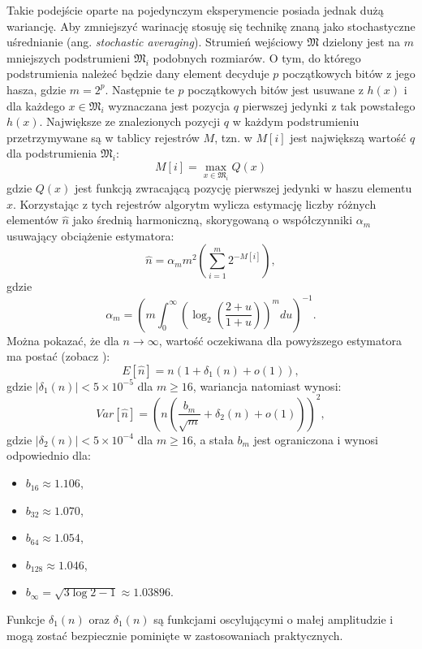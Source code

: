 Takie podejście oparte na pojedynczym eksperymencie posiada jednak dużą wariancję. Aby zmniejszyć warinację stosuję się technikę znaną jako stochastyczne uśrednianie (ang. \textit{stochastic averaging}). Strumień wejściowy $\mathfrak{M}$ dzielony jest na $m$ mniejszych podstrumieni $\mathfrak{M}_i$ podobnych rozmiarów. O tym, do którego podstrumienia należeć będzie dany element decyduje $p$ początkowych bitów z jego hasza, gdzie $m = 2^p$. Następnie te $p$ początkowych bitów jest usuwane z $h(x)$ i dla  każdego $x\in \mathfrak{M}_i$ wyznaczana jest pozycja $q$ pierwszej jedynki z tak powstałego $h(x)$. Największe ze znalezionych pozycji $q$ w każdym podstrumieniu przetrzymywane są w tablicy rejestrów $M$, tzn. w $M[i]$ jest największą  wartość $q$
dla  podstrumienia $\mathfrak{M}_i$:
\begin{equation}
    M[i] = \max_{x \in \mathfrak{M}_i} Q(x)
\end{equation}
gdzie $Q(x)$ jest funkcją zwracającą  pozycję pierwszej jedynki w haszu elementu $x$.
 Korzystając z tych rejestrów algorytm wylicza estymację liczby różnych elementów $\hat{n}$
 jako średnią harmoniczną, skorygowaną o współczynniki ${\alpha}_{m}$ usuwający obciążenie estymatora:
\begin{equation}
    \hat{n} = {\alpha}_m{m}^{2}(\sum_{i=1}^{m} 2^{-M[i]}),
\end{equation}
gdzie
\begin{equation}
    {\alpha}_{m} = (m \int_{0}^{\infty} ({\log}_2(\frac{2 + u}{1 + u}))^m du)^{-1}.
\end{equation}
Można pokazać, że dla  $n \rightarrow \infty$, wartość oczekiwana dla powyższego estymatora ma postać (zobacz \cite{hll}):
\begin{equation}
    E[\hat{n}] = n(1 + {\delta}_1(n) + o(1)),
\end{equation}
gdzie $|{\delta}_1(n)| < 5 \times 10^{-5}$ dla $m \geq 16$, wariancja natomiast wynosi:
\begin{equation}
    Var[\hat{n}] = (n(\frac{{b}_m}{\sqrt{m}} + {\delta}_2(n) + o(1)))^2,
\end{equation}
 gdzie $|{\delta}_2(n)| < 5 \times 10^{-4}$ dla $m \geq 16$, a stała ${b}_m$ jest ograniczona i wynosi odpowiednio dla: 
 \begin{itemize}
 	\item ${b}_{16} \approx 1.106$, 
 	\item ${b}_{32} \approx 1.070$, 
 	\item ${b}_{64} \approx 1.054$, 
 	\item ${b}_{128} \approx 1.046$, 
 	\item ${b}_{\infty} = \sqrt{3\log{2} - 1} \approx 1.03896$. 
 \end{itemize}
 Funkcje ${\delta}_1(n)$ oraz ${\delta}_1(n)$ są funkcjami oscylującymi o małej amplitudzie i mogą zostać bezpiecznie pominięte w zastosowaniach praktycznych.

